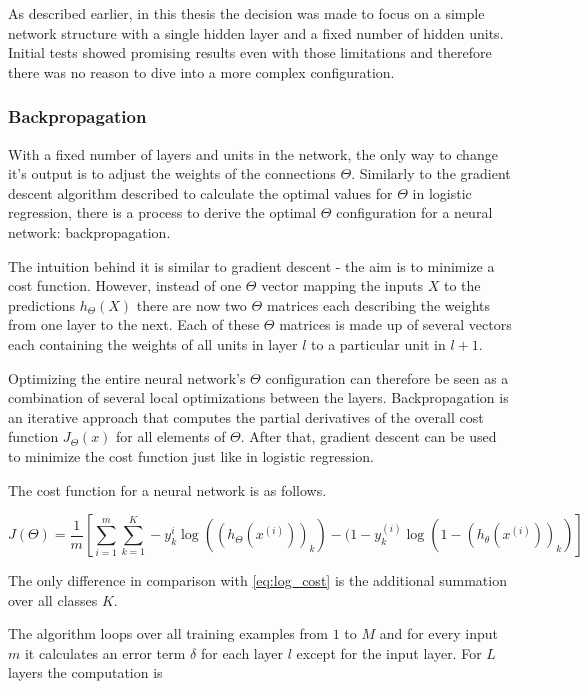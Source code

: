 As described earlier, in this thesis the decision was made to focus on a simple network structure with a single hidden layer and a fixed number of hidden units. Initial tests showed promising results even with those limitations and therefore there was no reason to dive into a more complex configuration.

\subsubsection{Backpropagation}

With a fixed number of layers and units in the network, the only way to change it's output is to adjust the weights of the connections $\Theta$. Similarly to the gradient descent algorithm described to calculate the optimal values for $\Theta$ in logistic regression, there is a process to derive the optimal $\Theta$ configuration for a neural network: backpropagation.

The intuition behind it is similar to gradient descent - the aim is to minimize a cost function. However, instead of one $\Theta$ vector mapping the inputs $X$ to the predictions $h_\Theta(X)$ there are now two $\Theta$ matrices each describing the weights from one layer to the next. Each of these $\Theta$ matrices is made up of several vectors each containing the weights of all units in layer $l$ to a particular unit in $l+1$. 

Optimizing the entire neural network's $\Theta$ configuration can therefore be seen as a combination of several local optimizations between the layers. Backpropagation is an iterative approach that computes the partial derivatives of the overall cost function $J_\Theta(x)$ for all elements of $\Theta$. After that, gradient descent can be used to minimize the cost function just like in logistic regression.

The cost function for a neural network is as follows.

\begin{equation}
    J(\Theta) = \frac{1}{m} \left[\sum_{i=1}^m \sum_{k=1}^K -y_k^{i} \log((h_\Theta(x^{(i)}))_k) - 
    (1-y_k^{(i)} \log(1-(h_\theta(x^{(i)}))_k)\right]
    \label{eq:nn_cost}
\end{equation}

The only difference in comparison with \eqref{eq:log_cost} is the additional summation over all classes $K$.

The algorithm loops over all training examples from $1$ to $M$ and for every input $m$ it calculates an error term $\delta$ for each layer $l$ except for the input layer. For $L$ layers the computation is

